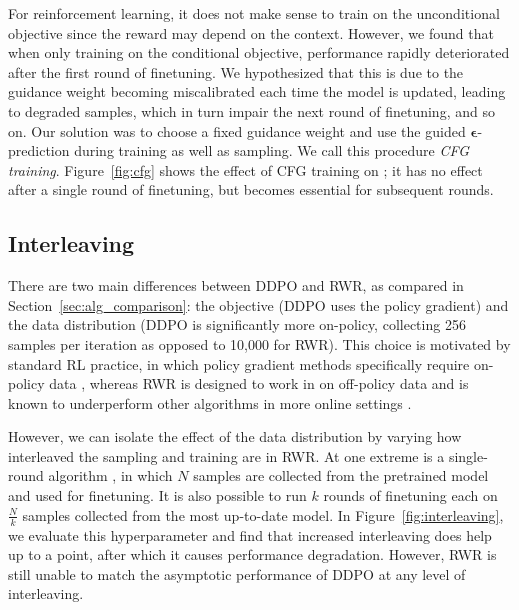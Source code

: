 \begin{appendices}
For reinforcement learning, it does not make sense to train on the unconditional objective since the reward may depend on the context.
However, we found that when only training on the conditional objective, performance rapidly deteriorated after the first round of finetuning. We hypothesized that this is due to the guidance weight becoming miscalibrated each time the model is updated, leading to degraded samples, which in turn impair the next round of finetuning, and so on.
Our solution was to choose a fixed guidance weight and use the guided $\bm{\epsilon}$-prediction during training as well as sampling.
We call this procedure \emph{CFG training}. Figure~\ref{fig:cfg} shows the effect of CFG training on \methodff{}; it has no effect after a single round of finetuning, but becomes essential for subsequent rounds.



\subsection{Interleaving}
There are two main differences between DDPO and RWR, as compared in Section~\ref{sec:alg_comparison}:
the objective (DDPO uses the policy gradient) and the data distribution (DDPO is significantly more on-policy, collecting 256 samples per iteration as opposed to 10,000 for RWR).
This choice is motivated by standard RL practice, in which policy gradient methods specifically require on-policy data \citep{sutton1999policy}, whereas RWR is designed to work in on off-policy data \citep{nair2020accelerating} and is known to underperform other algorithms in more online settings \citep{duan2016benchmarking}.

However, we can isolate the effect of the data distribution by varying how interleaved the sampling and training are in RWR.
At one extreme is a single-round algorithm \citep{lee2023aligning}, in which $N$ samples are collected from the pretrained model and used for finetuning.
It is also possible to run $k$ rounds of finetuning each on $\frac{N}{k}$ samples collected from the most up-to-date model.
In Figure~\ref{fig:interleaving}, we evaluate this hyperparameter and find that increased interleaving does help up to a point, after which it causes performance degradation. However, RWR is still unable to match the asymptotic performance of DDPO at any level of interleaving.




\end{appendices}
